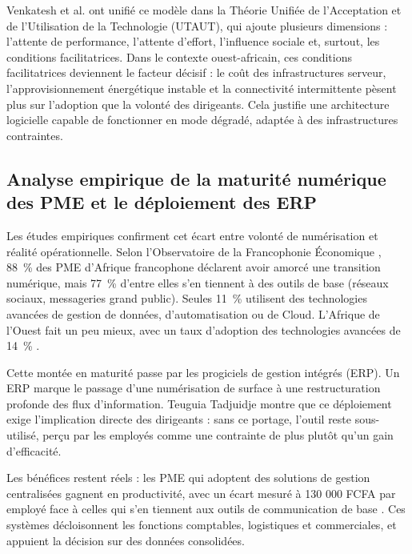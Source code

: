 Venkatesh et al. \cite{venkateshUserAcceptanceInformation2003} ont unifié ce modèle dans la Théorie Unifiée de l'Acceptation et de l'Utilisation de la Technologie (UTAUT), qui ajoute plusieurs dimensions : l'attente de performance, l'attente d'effort, l'influence sociale et, surtout, les conditions facilitatrices. Dans le contexte ouest-africain, ces conditions facilitatrices deviennent le facteur décisif : le coût des infrastructures serveur, l'approvisionnement énergétique instable et la connectivité intermittente pèsent plus sur l'adoption que la volonté des dirigeants. Cela justifie une architecture logicielle capable de fonctionner en mode dégradé, adaptée à des infrastructures contraintes.

\subsection{Analyse empirique de la maturité numérique des PME et le déploiement des ERP}

Les études empiriques confirment cet écart entre volonté de numérisation et réalité opérationnelle. Selon l'Observatoire de la Francophonie Économique \cite{IMPACTLADOPTIONTECHNOLOGIES2025}, 88~\% des PME d'Afrique francophone déclarent avoir amorcé une transition numérique, mais 77~\% d'entre elles s'en tiennent à des outils de base (réseaux sociaux, messageries grand public). Seules 11~\% utilisent des technologies avancées de gestion de données, d'automatisation ou de Cloud. L'Afrique de l'Ouest fait un peu mieux, avec un taux d'adoption des technologies avancées de 14~\% \cite{IMPACTLADOPTIONTECHNOLOGIES2025}. 

Cette montée en maturité passe par les progiciels de gestion intégrés (ERP). Un ERP marque le passage d'une numérisation de surface à une restructuration profonde des flux d'information. Teuguia Tadjuidje \cite{tadjuidjeTechnologiesLeadershipRevolutionner2024} montre que ce déploiement exige l'implication directe des dirigeants : sans ce portage, l'outil reste sous-utilisé, perçu par les employés comme une contrainte de plus plutôt qu'un gain d'efficacité. 

Les bénéfices restent réels : les PME qui adoptent des solutions de gestion centralisées gagnent en productivité, avec un écart mesuré à 130 000 FCFA par employé face à celles qui s'en tiennent aux outils de communication de base \cite{IMPACTLADOPTIONTECHNOLOGIES2025}. Ces systèmes décloisonnent les fonctions comptables, logistiques et commerciales, et appuient la décision sur des données consolidées.

